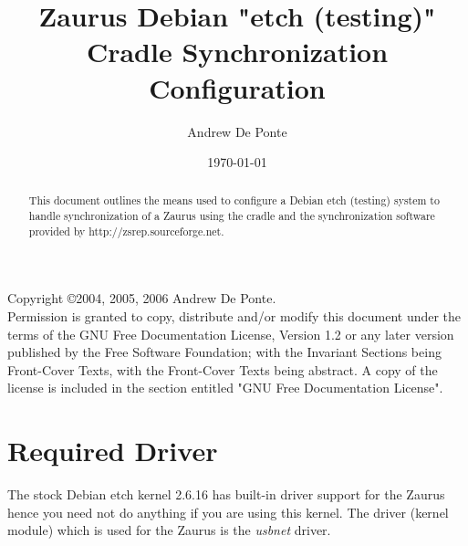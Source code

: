 \documentclass{article}
\title{Zaurus Debian "etch (testing)" Cradle Synchronization Configuration}
\author{Andrew De Ponte}
\date{\today}
\begin{document}
\maketitle

\newpage

\begin{abstract}
This document outlines the means used to configure a Debian etch
(testing) system to handle synchronization of a Zaurus using the cradle
and the synchronization software provided by
http://zsrep.sourceforge.net.
\end{abstract}

\newpage

\noindent Copyright \copyright 2004, 2005, 2006 Andrew De Ponte.\\
Permission is granted to copy, distribute and/or modify this document under
the terms of the GNU Free Documentation License, Version 1.2 or any later
version published by the Free Software Foundation; with the Invariant
Sections being Front-Cover Texts, with the Front-Cover  Texts being
abstract. A copy of the license is included in the section entitled "GNU
Free Documentation License".

\newpage

\tableofcontents

\newpage


\section{Required Driver}

The stock Debian etch kernel 2.6.16 has built-in driver support for the
Zaurus hence you need not do anything if you are using this kernel.  The
driver (kernel module) which is used for the Zaurus is the \emph{usbnet}
driver.
\end{document}
